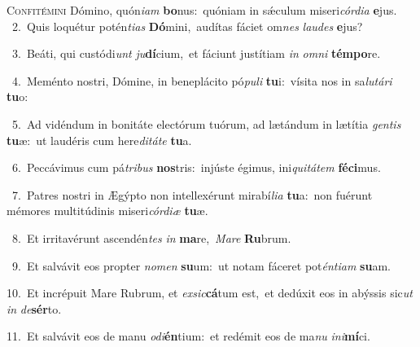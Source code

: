 \lettrine{\initial\textcolor{\initialcolor}{C}}{onfitémini} Dómino, quón\-\textit{i}\-\textit{am} \textbf{bo}\-nus:~\star quóniam in sǽculum miseri\-\textit{cór}\-\textit{di}\textit{a} \textbf{e}\-jus.\\
{\numbfont\textcolor{\numbcolor}{~2.}}~Quis loquétur potén\-\textit{ti}\-\textit{as} \textbf{Dó}\-mini,~\star audítas fáciet om\textit{nes} \textit{lau}\-\textit{des} \textbf{e}\-jus?\par
{\numbfont\textcolor{\numbcolor}{~3.}}~Beáti, qui custódi\textit{unt} \textit{ju}\-\textbf{dí}cium,~\star et fáciunt justítiam \textit{in} \textit{om}\-\textit{ni} \textbf{tém}\-\textbf{po}re.\par
{\numbfont\textcolor{\numbcolor}{~4.}}~Meménto nostri, Dómine, in beneplácito pó\-\textit{pu}\-\textit{li} \textbf{tu}\-i:~\star vísita nos in sa\-\textit{lu}\-\textit{tá}\textit{ri} \textbf{tu}\-o:\par
{\numbfont\textcolor{\numbcolor}{~5.}}~Ad vidéndum in bonitáte electórum tuórum, ad lætándum in lætítia \textit{gen}\-\textit{tis} \textbf{tu}\-æ:~\star ut laudéris cum here\-\textit{di}\-\textit{tá}\textit{te} \textbf{tu}\-a.\par
{\numbfont\textcolor{\numbcolor}{~6.}}~Peccávimus cum pá\-\textit{tri}\-\textit{bus} \textbf{nos}\-tris:~\star injúste égimus, ini\-\textit{qui}\-\textit{tá}\textit{tem} \textbf{fé}\-\textbf{ci}mus.\par
{\numbfont\textcolor{\numbcolor}{~7.}}~Patres nostri in Ægýpto non intellexérunt mirabí\-\textit{li}\-\textit{a} \textbf{tu}\-a:~\star non fuérunt mémores multitúdinis miseri\-\textit{cór}\-\textit{di}\textit{æ} \textbf{tu}\-æ.\par
{\numbfont\textcolor{\numbcolor}{~8.}}~Et irritavérunt ascendén\textit{tes} \textit{in} \textbf{ma}\-re,~\star \textit{Ma}\-\textit{re} \textbf{Ru}\-brum.\par
{\numbfont\textcolor{\numbcolor}{~9.}}~Et salvávit eos propter \textit{no}\-\textit{men} \textbf{su}\-um:~\star ut notam fáceret pot\-\textit{én}\-\textit{ti}\textit{am} \textbf{su}\-am.\par
{\numbfont\textcolor{\numbcolor}{10.}}~Et incrépuit Mare Rubrum, et \textit{ex}\-\textit{sic}\textbf{cá}tum est,~\star et dedúxit eos in abýssis sic\textit{ut} \textit{in} \textit{de}\-\textbf{sér}to.\par
{\numbfont\textcolor{\numbcolor}{11.}}~Et salvávit eos de manu \textit{o}\-\textit{di}\textbf{én}tium:~\star et redémit eos de ma\textit{nu} \textit{in}\-\textit{i}\textbf{mí}ci.\par
